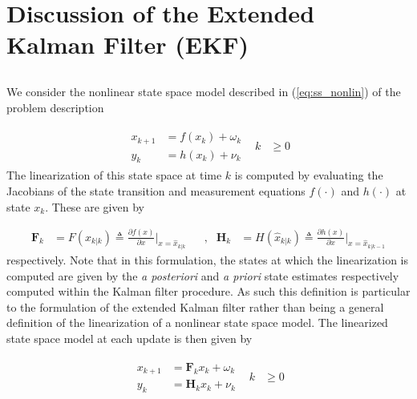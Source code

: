 
\section{Discussion of the Extended Kalman Filter (EKF)}
\label{sec:ekf}

\subsection{}
\setcounter{enumi}{3}

We consider the nonlinear state space model described in (\ref{eq:ss_nonlin}) of the problem description

\begin{align}
    \begin{split}
        x_{k+1} &= f(x_{k}) + \omega_{k} \\
        y_{k}   &= h(x_{k}) + \nu_{k}
    \end{split} & k &\geq 0 \nonumber \tag{3} \label{eq:ss_nonlin}
\end{align}
The linearization of this state space at time $k$ is computed by evaluating the Jacobians of the state transition and measurement equations $f(\cdot)$ and $h(\cdot)$ at state $x_{k}$. These are given by

\begin{align}
    \mathbf{F}_{k} &= F(\hat{x}_{k|k}) \triangleq \frac{\partial f(x)}{\partial x} \Bigr\rvert_{x = \hat{x}_{k|k}} & &, & \mathbf{H}_{k} &=  H(\hat{x}_{k|k}) \triangleq \frac{\partial h(x)}{\partial x} \Bigr\rvert_{x = \hat{x}_{k|k-1}} \label{eq:jacobian}
\end{align}
respectively. Note that in this formulation, the states at which the linearization is computed are given by the \emph{a posteriori} and \emph{a priori} state estimates respectively computed within the Kalman filter procedure. As such this definition is particular to the formulation of the extended Kalman filter rather than being a general definition of the linearization of a nonlinear state space model. The linearized state space model at each update is then given by

\begin{align}
    \begin{split}
        x_{k+1} &= \mathbf{F}_{k}x_{k} + \omega_{k} \\
        y_{k}   &= \mathbf{H}_{k}x_{k} + \nu_{k}
    \end{split} & k &\geq 0 \label{eq:ss_lin}
\end{align}

